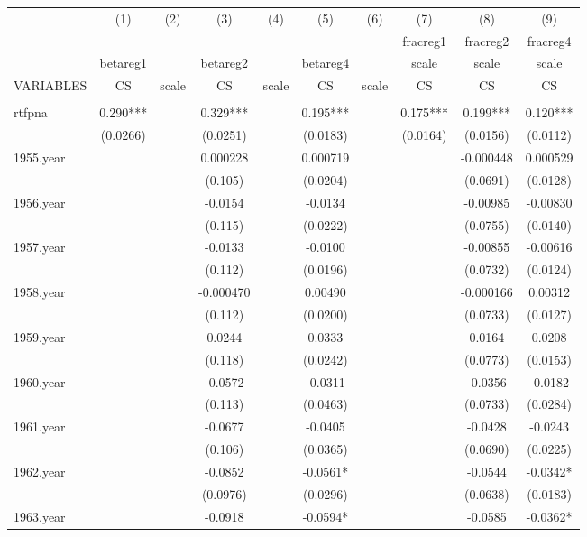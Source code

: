 \documentclass[]{article}
\begin{document}
\begin{tabular}{lccccccccc} \hline
 & (1) & (2) & (3) & (4) & (5) & (6) & (7) & (8) & (9) \\
 &  &  &  &  &  &  & fracreg1 & fracreg2 & fracreg4 \\
 & betareg1 &  & betareg2 &  & betareg4 &  & scale & scale & scale \\
VARIABLES & CS & scale & CS & scale & CS & scale & CS & CS & CS \\ \hline
 &  &  &  &  &  &  &  &  &  \\
rtfpna & 0.290*** &  & 0.329*** &  & 0.195*** &  & 0.175*** & 0.199*** & 0.120*** \\
 & (0.0266) &  & (0.0251) &  & (0.0183) &  & (0.0164) & (0.0156) & (0.0112) \\
1955.year &  &  & 0.000228 &  & 0.000719 &  &  & -0.000448 & 0.000529 \\
 &  &  & (0.105) &  & (0.0204) &  &  & (0.0691) & (0.0128) \\
1956.year &  &  & -0.0154 &  & -0.0134 &  &  & -0.00985 & -0.00830 \\
 &  &  & (0.115) &  & (0.0222) &  &  & (0.0755) & (0.0140) \\
1957.year &  &  & -0.0133 &  & -0.0100 &  &  & -0.00855 & -0.00616 \\
 &  &  & (0.112) &  & (0.0196) &  &  & (0.0732) & (0.0124) \\
1958.year &  &  & -0.000470 &  & 0.00490 &  &  & -0.000166 & 0.00312 \\
 &  &  & (0.112) &  & (0.0200) &  &  & (0.0733) & (0.0127) \\
1959.year &  &  & 0.0244 &  & 0.0333 &  &  & 0.0164 & 0.0208 \\
 &  &  & (0.118) &  & (0.0242) &  &  & (0.0773) & (0.0153) \\
1960.year &  &  & -0.0572 &  & -0.0311 &  &  & -0.0356 & -0.0182 \\
 &  &  & (0.113) &  & (0.0463) &  &  & (0.0733) & (0.0284) \\
1961.year &  &  & -0.0677 &  & -0.0405 &  &  & -0.0428 & -0.0243 \\
 &  &  & (0.106) &  & (0.0365) &  &  & (0.0690) & (0.0225) \\
1962.year &  &  & -0.0852 &  & -0.0561* &  &  & -0.0544 & -0.0342* \\
 &  &  & (0.0976) &  & (0.0296) &  &  & (0.0638) & (0.0183) \\
1963.year &  &  & -0.0918 &  & -0.0594* &  &  & -0.0585 & -0.0362* \\

\end{tabular}
\end{document}
